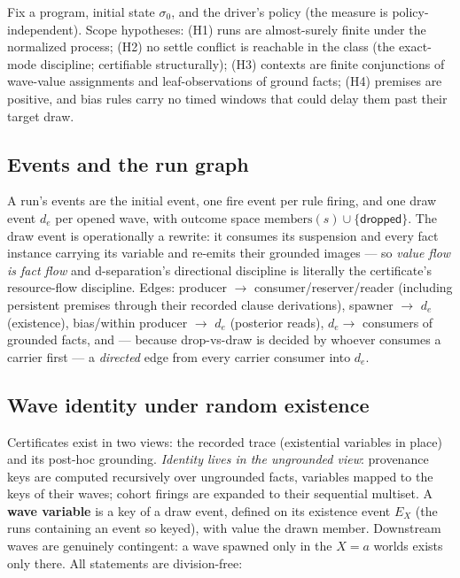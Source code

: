 \documentclass[11pt]{article}
\theoremstyle{definition}
\theoremstyle{remark}
\begin{document}
Fix a program, initial state $\sigma_0$, and the driver's policy (the
measure is policy-independent).  Scope hypotheses: (H1) runs are
almost-surely finite under the normalized process; (H2) no settle
conflict is reachable in the class (the exact-mode discipline;
certifiable structurally); (H3) contexts are finite conjunctions of
wave-value assignments and leaf-observations of ground facts; (H4)
premises are positive, and bias rules carry no timed windows that
could delay them past their target draw.

\subsection{Events and the run graph}

A run's events are the initial event, one fire event per rule firing,
and one draw event $d_e$ per opened wave, with outcome space
$\mathrm{members}(s)\cup\{\mathsf{dropped}\}$.  The draw event is
operationally a rewrite: it consumes its suspension and every fact
instance carrying its variable and re-emits their grounded images ---
so \emph{value flow is fact flow} and d-separation's directional
discipline is literally the certificate's resource-flow discipline.
Edges: producer $\to$ consumer/reserver/reader (including persistent
premises through their recorded clause derivations), spawner $\to$
$d_e$ (existence), bias/within producer $\to$ $d_e$ (posterior reads),
$d_e \to$ consumers of grounded facts, and --- because drop-vs-draw is
decided by whoever consumes a carrier first --- a \emph{directed} edge
from every carrier consumer into $d_e$.

\subsection{Wave identity under random existence}

Certificates exist in two views: the recorded trace (existential
variables in place) and its post-hoc grounding.  \emph{Identity lives
in the ungrounded view}: provenance keys are computed recursively over
ungrounded facts, variables mapped to the keys of their waves; cohort
firings are expanded to their sequential multiset.  A \textbf{wave
variable} is a key of a draw event, defined on its existence event
$E_X$ (the runs containing an event so keyed), with value the drawn
member.  Downstream waves are genuinely contingent: a wave spawned
only in the $X{=}a$ worlds exists only there.  All statements are
division-free:
\end{document}
